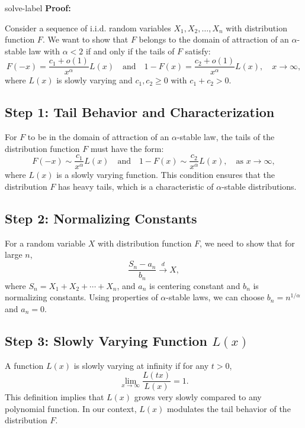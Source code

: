 	\begin{solve}{}{solve-label}
\textbf{Proof:}

Consider a sequence of i.i.d. random variables \( X_1, X_2, \ldots, X_n \) with distribution function \( F \). We want to show that \( F \) belongs to the domain of attraction of an \(\alpha\)-stable law with \( \alpha < 2 \) if and only if the tails of \( F \) satisfy: \[ F(-x) = \frac{c_1 + o(1)}{x^\alpha} L(x) \quad \text{and} \quad 1 - F(x) = \frac{c_2 + o(1)}{x^\alpha} L(x), \quad x \to \infty, \] where \( L(x) \) is slowly varying and \( c_1, c_2 \geq 0 \) with \( c_1 + c_2 > 0 \). \\
\subsection*{Step 1: Tail Behavior and Characterization} For \( F \) to be in the domain of attraction of an \(\alpha\)-stable law, the tails of the distribution function \( F \) must have the form: \[ F(-x) \sim \frac{c_1}{x^\alpha} L(x) \quad \text{and} \quad 1 - F(x) \sim \frac{c_2}{x^\alpha} L(x), \quad \text{as } x \to \infty, \] where \( L(x) \) is a slowly varying function. This condition ensures that the distribution \( F \) has heavy tails, which is a characteristic of \(\alpha\)-stable distributions. \\
\subsection*{Step 2: Normalizing Constants} For a random variable \( X \) with distribution function \( F \), we need to show that for large \( n \), \[ \frac{S_n - a_n}{b_n} \xrightarrow{d} X, \] where \( S_n = X_1 + X_2 + \cdots + X_n \), and \( a_n \) is centering constant and \( b_n \) is normalizing constants. Using properties of \(\alpha\)-stable laws, we can choose \( b_n = n^{1/\alpha} \) and \( a_n = 0 \). \\
\subsection*{Step 3: Slowly Varying Function \( L(x) \)} A function \( L(x) \) is slowly varying at infinity if for any \( t > 0 \), \[ \lim_{x \to \infty} \frac{L(tx)}{L(x)} = 1. \] This definition implies that \( L(x) \) grows very slowly compared to any polynomial function. In our context, \( L(x) \) modulates the tail behavior of the distribution \( F \). \\

\end{solve}

